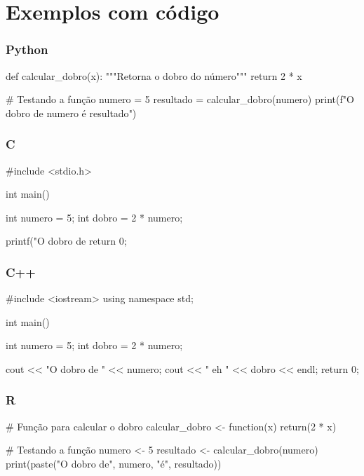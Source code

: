 \section{Exemplos com código} %

\begin{frame}[fragile]
    \frametitle{Python}
    
    \begin{python}
def calcular_dobro(x):
    """Retorna o dobro do número"""
    return 2 * x

# Testando a função
numero = 5
resultado = calcular_dobro(numero)
print(f"O dobro de {numero} é {resultado}")
    \end{python}
\end{frame}

\begin{frame}[fragile]
    \frametitle{C}
    
    \begin{clang}
#include <stdio.h>

int main() {
    int numero = 5;
    int dobro = 2 * numero;
    
    printf("O dobro de %
    return 0;
}
    \end{clang}
\end{frame}

\begin{frame}[fragile]
    \frametitle{C++}
    
    \begin{cpp}
#include <iostream>
using namespace std;

int main() {
    int numero = 5;
    int dobro = 2 * numero;
    
    cout << "O dobro de " << numero;
    cout << " eh " << dobro << endl;
    return 0;
}
    \end{cpp}
\end{frame}

\begin{frame}[fragile]
    \frametitle{R}
    
    \begin{rlang}
# Função para calcular o dobro
calcular_dobro <- function(x) {
  return(2 * x)
}

# Testando a função
numero <- 5
resultado <- calcular_dobro(numero)
print(paste("O dobro de", numero, "é", resultado))
    \end{rlang}
\end{frame}

